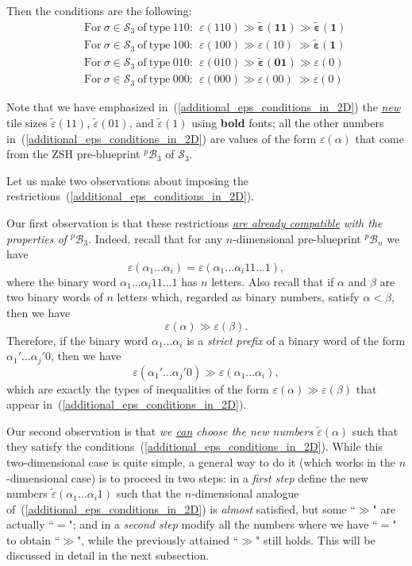 \documentclass[12pt,letterpaper]{article}
\renewcommand{\S}{\mathcal{S}}
\newcommand{\B}{\mathcal{B}}
\newcommand{\eps}{\varepsilon}
\newcommand{\et}{\tilde\eps}
\renewcommand{\a}{\alpha}
\begin{document}
\noindent
Then the conditions are the following:
%
\begin{eqnarray}
\label{additional_eps_conditions_in_2D}
& & \mathrm{For} \  \sigma \in \S_3 \  \mathrm{of \ type} \ 110:  \ \      
\eps(110)    \gg   \boldsymbol{\et(11)}   \gg   \boldsymbol{\et(1)} 
\\ \nonumber
& & \mathrm{For} \  \sigma \in \S_3 \  \mathrm{of \ type} \ 100:  \ \      
\eps(100)    \gg     \eps(10)                \     \gg   \boldsymbol{\et(1)} 
\\ \nonumber
& & \mathrm{For} \  \sigma \in \S_3 \  \mathrm{of \ type} \ 010:  \ \      
\eps(010)    \gg  \boldsymbol{\et(01)}   \gg             \eps(0)
\\ \nonumber
& & \mathrm{For} \  \sigma \in \S_3 \  \mathrm{of \ type} \ 000:  \ \      
\eps(000)    \gg     \eps(00)               \     \gg           \eps(0) 
\end{eqnarray}
%

\noindent
Note that we have emphasized in~(\ref{additional_eps_conditions_in_2D}) the \ul{\em new} tile sizes $\et(11)$, $\et(01)$, and $\et(1)$ using {\bf bold} fonts; all the other numbers  in~(\ref{additional_eps_conditions_in_2D}) are values of the form $\eps(\alpha)$ that come from the ZSH pre-blueprint $^p\!\B_3$ of $\S_3$. 

\medskip

\noindent
Let us make two observations about imposing the restrictions~(\ref{additional_eps_conditions_in_2D}). 

Our first observation is that  these restrictions {\em \ul{are already compatible} with the properties of $^p\!\B_3$}. Indeed, recall that for any $n$-dimensional pre-blueprint $^p\!\B_n$ we have 
$$
\eps(\a_1...\a_i) = \eps(\a_1...\a_i 11...1), 
$$ 
where the binary word $\a_1...\a_i 11...1$ has $n$ letters. Also recall  that if $\alpha$ and $\beta$ are two binary words of $n$ letters which, regarded as binary numbers, satisfy $\alpha < \beta$, then we have 
$$
\eps(\alpha) \gg \eps(\beta).
$$ 
Therefore, if the binary word $\a_1...\a_i$ is a {\em strict prefix} of a binary word of the form $\a_1'...\a_j'0$, then we have
$$
\eps(\a_1'...\a_j'0) \gg \eps(\a_1...\a_i),
$$ 
which are exactly the types of inequalities of the form $\eps(\alpha) \gg \eps(\beta)$ that appear in~(\ref{additional_eps_conditions_in_2D}). 

Our second observation is that  {\em we \ul{can} choose the new numbers $\et(\alpha)$} such that they satisfy the conditions~(\ref{additional_eps_conditions_in_2D}). 
While this two-dimensional case is quite simple, a general way to do it (which works in the $n$-dimensional case) is to 
proceed in two steps: in a {\em first step} define the new numbers  $\et(\a_1...\a_i 1)$ such that the $n$-dimensional analogue of~(\ref{additional_eps_conditions_in_2D}) is {\em almost} satisfied, but some ``$\gg$" are actually ``$=$"; and in a {\em second step} modify all the numbers where we have ``$=$" to obtain ``$\gg$", while  the previously attained ``$\gg$" still holds. This will be discussed in detail in the next subsection.
\end{document}
